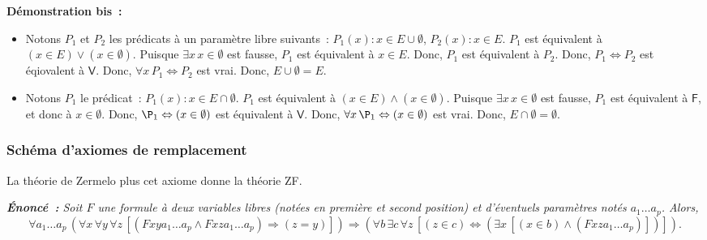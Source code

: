 \noindent\textbf{Démonstration bis :} 
    \begin{itemize}[nosep]
        \item Notons $P_1$ et $P_2$ les prédicats à un paramètre libre suivants : $P_1(x): x \in E \cup \emptyset$, $P_2(x): x \in E$. 
            $P_1$ est équivalent à $(x \in E) \vee (x \in \emptyset)$.
            Puisque $\exists x \, x \in \emptyset$ est fausse, $P_1$ est équivalent à $x \in E$.
            Donc, $P_1$ est équivalent à $P_2$.
            Donc, $P_1 \Leftrightarrow P_2$ est éqiovalent à $\mathsf{V}$.
            Donc, $\forall x \, P_1 \Leftrightarrow P_2$ est vrai.
            Donc, $E \cup \emptyset = E$.
        \item Notons $P_1$ le prédicat : $P_1(x): x \in E \cap \emptyset$. 
            $P_1$ est équivalent à $(x \in E) \wedge (x \in \emptyset)$.
            Puisque $\exists x \, x \in \emptyset$ est fausse, $P_1$ est équivalent à $\mathsf{F}$, et donc à $x \in \emptyset$.
            Donc, $\P_1 \Leftrightarrow (x \in \emptyset)$ est équivalent à $\mathsf{V}$.
            Donc, $\forall x \, \P_1 \Leftrightarrow (x \in \emptyset)$ est vrai.
            Donc, $E \cap \emptyset = \emptyset$.
    \end{itemize}

    \done

\subsubsection{Schéma d'axiomes de remplacement}

La théorie de Zermelo plus cet axiome donne la théorie ZF. 

\medskip

\noindent\textit{\textbf{Énoncé :} Soit $F$ une formule à deux variables libres (notées en première et second position) et d'éventuels paramètres notés $a_1 \dots a_p$. Alors, }
\begin{equation*}
    \forall a_1 \dots a_p \, 
        \left( 
            \forall x \, \forall y \, \forall z \, \left[
                (F x y a_1 \dots a_p \wedge F x z a_1 \dots a_p) \Rightarrow (z = y)
            \right]
        \right)
        \Rightarrow
        \left(
            \forall b \, \exists c \, \forall z \, \left[
                (z \in c) \Leftrightarrow (\exists x \, [(x \in b) \wedge (F x z a_1 \dots a_p)])
            \right]
        \right)
    .
\end{equation*}

\medskip

